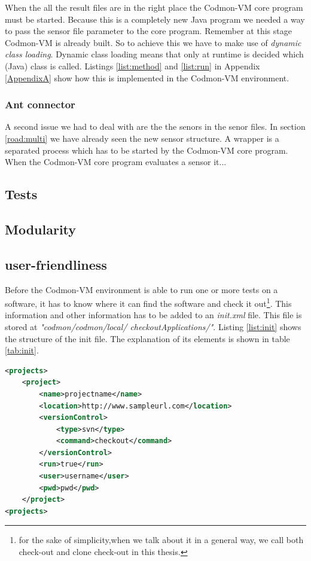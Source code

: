 \documentclass{article}
\newcommand{\project}{Codmon-VM}
\begin{document}
\noindent When the all the result files are in the right place the \project{} core program must be started. Because this is a completely new Java program we needed a way to pass the sensor file parameter to 
the core program. Remember at this stage \project{} is already built. So to achieve this we have to make use of \emph{dynamic class loading}. Dynamic class loading means that only at runtime is decided which 
(Java) class is called. Listings \ref{list:method} and \ref{list:run} in Appendix \ref{AppendixA} show how this is implemented in the \project{} environment.

\subsubsection{Ant connector}
\label{imp:ant}
A second issue we had to deal with are the the senors in the senor files. In section \ref{road:multi} we have already seen the new sensor structure. A wrapper is a separated process which has to be started by 
the \project{} core program.  When the \project{} core program evaluates a sensor it...
 
\subsection{Tests}
\label{imp:test}

\subsection{Modularity}
\label{imp:modular}

\subsection{user-friendliness}
\label{imp-user}

Before the \project{} environment is able to run one or more tests on a software, it has to know where it can find the software and check it out\footnote{for the sake of simplicity,when we talk about it in a 
general way, we call both check-out and clone check-out in this thesis.}. This information and other information has to be added to an \emph{init.xml} file. This file is stored at \emph{"codmon/codmon/local/
checkoutApplications/"}. Listing \ref{list:init} shows the structure of the init file. The explanation of its elements is shown in table \ref{tab:init}. 

\begin{lstlisting}[frame=shadowbox, language=XML,showstringspaces=false]
 <projects>
	<project>
		<name>projectname</name>
		<location>http://www.sampleurl.com</location>
		<versionControl>
			<type>svn</type>
			<command>checkout</command>
		</versionControl>
		<run>true</run>
		<user>username</user>
		<pwd>pwd</pwd>
	</project>
<projects>
\end{lstlisting} 
\end{document}
